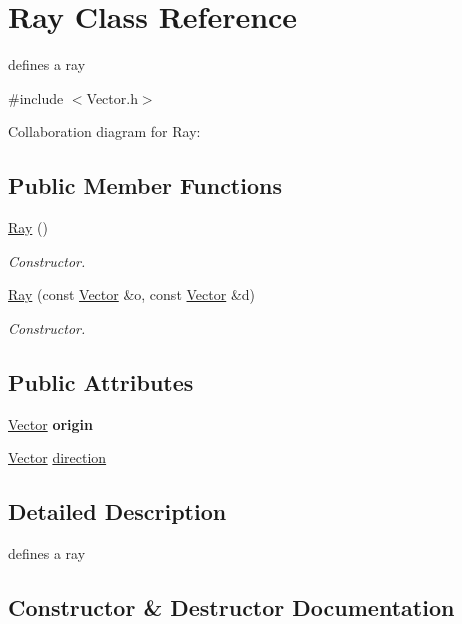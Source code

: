 \hypertarget{classRay}{}\section{Ray Class Reference}
\label{classRay}


defines a ray  




{\ttfamily \#include $<$Vector.\+h$>$}



Collaboration diagram for Ray\+:
\subsection*{Public Member Functions}
\begin{DoxyCompactItemize}
\item 
\hyperlink{classRay_a2e3d2c29f2df4ab3da10da79d4acb852}{Ray} ()
\begin{DoxyCompactList}\small\item\em Constructor. \end{DoxyCompactList}\item 
\hyperlink{classRay_a91e6be9287d2fec117feca20ef4d05bb}{Ray} (const \hyperlink{classVector}{Vector} \&o, const \hyperlink{classVector}{Vector} \&d)
\begin{DoxyCompactList}\small\item\em Constructor. \end{DoxyCompactList}\end{DoxyCompactItemize}
\subsection*{Public Attributes}
\begin{DoxyCompactItemize}
\item 
\mbox{\label{classRay_ad22b7e40f36fc995d0b84e0f696ad358}} 
\hyperlink{classVector}{Vector} {\bfseries origin}
\item 
\hyperlink{classVector}{Vector} \hyperlink{classRay_a16aab6305abe72d63f7d4dab554db7c1}{direction}
\end{DoxyCompactItemize}


\subsection{Detailed Description}
defines a ray 

\subsection{Constructor \& Destructor Documentation}
\mbox{\label{classRay_a2e3d2c29f2df4ab3da10da79d4acb852}} 
